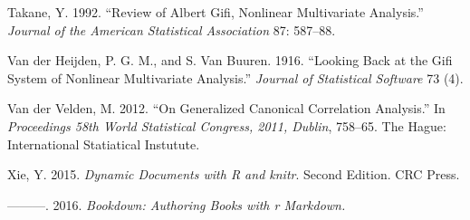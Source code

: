 \documentclass[
  12pt,
]{book}
\newlength{\cslhangindent}
\newenvironment{CSLReferences}[2] %
 {\begin{list}{}{%
  \setlength{\itemindent}{0pt}
  \setlength{\leftmargin}{0pt}
  \setlength{\parsep}{0pt}
  \ifodd #1
   \setlength{\leftmargin}{\cslhangindent}
   \setlength{\itemindent}{-1\cslhangindent}
  \fi
  \setlength{\itemsep}{#2\baselineskip}}}
 {\end{list}}
\begin{document}
\begin{CSLReferences}{1}{0}
Takane, Y. 1992. {``{Review of Albert Gifi, Nonlinear Multivariate Analysis}.''} \emph{Journal of the American Statistical Association} 87: 587--88.

Van der Heijden, P. G. M., and S. Van Buuren. 1916. {``Looking Back at the Gifi System of Nonlinear Multivariate Analysis.''} \emph{Journal of Statistical Software} 73 (4).

Van der Velden, M. 2012. {``On Generalized Canonical Correlation Analysis.''} In \emph{Proceedings 58th World Statistical Congress, 2011, Dublin}, 758--65. The Hague: International Statiatical Instutute.

Xie, Y. 2015. \emph{{Dynamic Documents with R and knitr}}. Second Edition. CRC Press.

---------. 2016. \emph{Bookdown: Authoring Books with r Markdown.}

\end{CSLReferences}
\end{document}
